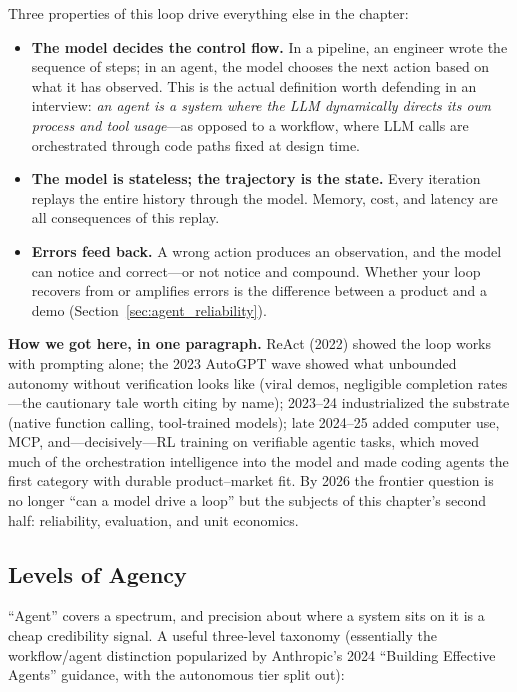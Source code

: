 Three properties of this loop drive everything else in the chapter:

\begin{itemize}
    \item \textbf{The model decides the control flow.} In a pipeline, an engineer wrote the sequence of steps; in an agent, the model chooses the next action based on what it has observed. This is the actual definition worth defending in an interview: \textit{an agent is a system where the LLM dynamically directs its own process and tool usage}---as opposed to a workflow, where LLM calls are orchestrated through code paths fixed at design time.
    \item \textbf{The model is stateless; the trajectory is the state.} Every iteration replays the entire history through the model. Memory, cost, and latency are all consequences of this replay.
    \item \textbf{Errors feed back.} A wrong action produces an observation, and the model can notice and correct---or not notice and compound. Whether your loop recovers from or amplifies errors is the difference between a product and a demo (Section~\ref{sec:agent_reliability}).
\end{itemize}

\textbf{How we got here, in one paragraph.} ReAct (2022) showed the loop works with prompting alone; the 2023 AutoGPT wave showed what unbounded autonomy without verification looks like (viral demos, negligible completion rates---the cautionary tale worth citing by name); 2023--24 industrialized the substrate (native function calling, tool-trained models); late 2024--25 added computer use, MCP, and---decisively---RL training on verifiable agentic tasks, which moved much of the orchestration intelligence into the model and made coding agents the first category with durable product--market fit. By 2026 the frontier question is no longer ``can a model drive a loop'' but the subjects of this chapter's second half: reliability, evaluation, and unit economics.

\subsection{Levels of Agency}

``Agent'' covers a spectrum, and precision about where a system sits on it is a cheap credibility signal. A useful three-level taxonomy (essentially the workflow/agent distinction popularized by Anthropic's 2024 ``Building Effective Agents'' guidance, with the autonomous tier split out):

